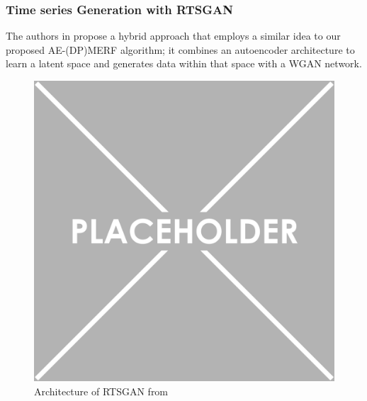 \subsubsection{Time series Generation with RTSGAN}
The authors in \parencite{pei2021towards} propose a hybrid approach that employs a similar idea to our proposed AE-(DP)MERF algorithm; it combines an autoencoder architecture to learn a latent space and generates data within that space with a WGAN network.

\begin{figure}[h]
    \centering
    \includegraphics[scale=0.5]{../images/placeholder.png}
    \caption[]{Architecture of RTSGAN from \parencite{pei2021towards}}
\end{figure}

